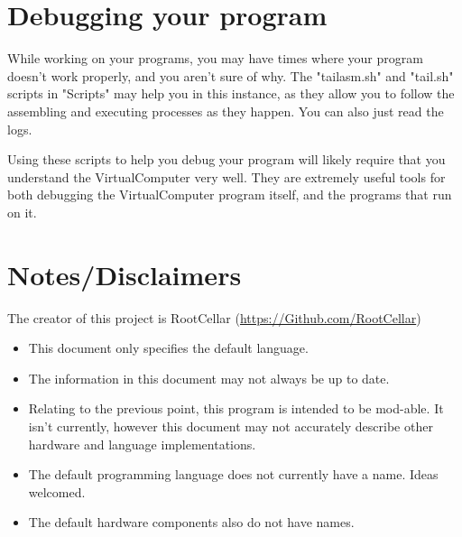\documentclass[12pt]{article}
\begin{document}
\section{Debugging your program}

While working on your programs, you may have times where your program doesn't work properly,
and you aren't sure of why. The "tailasm.sh" and "tail.sh" scripts in "Scripts" may help you
in this instance, as they allow you to follow the assembling and executing processes as they
happen. You can also just read the logs.

Using these scripts to help you debug your program will likely require that you understand
the VirtualComputer very well. They are extremely useful tools for both debugging the
VirtualComputer program itself, and the programs that run on it.

\section{Notes/Disclaimers}

The creator of this project is RootCellar (\url{https://Github.com/RootCellar})

\begin{itemize}

\item
This document only specifies the default language.

\item
The information in this document may not always be up to date.

\item
Relating to the previous point, this program is intended to be mod-able.
It isn't currently, however this document may not accurately describe other hardware and
language implementations.

\item
The default programming language does not currently have a name. Ideas welcomed.

\item
The default hardware components also do not have names.

\end{itemize}
\end{document}
